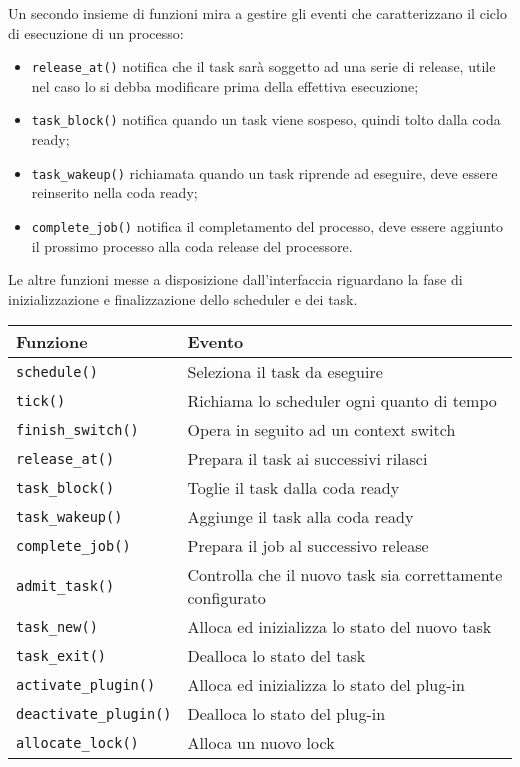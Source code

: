 \begin{appendices}
Un secondo insieme di funzioni mira a gestire gli eventi che caratterizzano il ciclo di esecuzione di un processo:\\

\begin{itemize}
	\item \texttt{release\_at()} notifica che il task sarà soggetto ad una serie di release, utile nel caso lo si debba modificare prima della effettiva esecuzione;
	\item \texttt{task\_block()} notifica quando un task viene sospeso, quindi tolto dalla coda ready;
	\item \texttt{task\_wakeup()} richiamata quando un task riprende ad eseguire, deve essere reinserito nella coda ready;
	\item \texttt{complete\_job()} notifica il completamento del processo, deve essere aggiunto il prossimo processo alla coda release del processore.\\
\end{itemize}

Le altre funzioni messe a disposizione dall'interfaccia riguardano la fase di inizializzazione e finalizzazione dello scheduler e dei task.\\

\begin{table}
  \centering
  \begin{tabular}{|ll|}
	\hline
	    Funzione & Evento \\ \hline \hline
	   
\texttt{schedule()} 			&	Seleziona il task da eseguire \\
\texttt{tick()} 				&	Richiama lo scheduler ogni quanto di tempo \\
\texttt{finish\_switch()}		&	Opera in seguito ad un context switch \\
\hline
\texttt{release\_at()}			&	Prepara il task ai successivi rilasci \\
\texttt{task\_block()}			&	Toglie il task dalla coda ready \\
\texttt{task\_wakeup()}			&	Aggiunge il task alla coda ready \\
\texttt{complete\_job()}		&	Prepara il job al successivo release \\
\hline
\texttt{admit\_task()}			&	Controlla che il nuovo task sia correttamente configurato \\
\texttt{task\_new()}			&	Alloca ed inizializza lo stato del nuovo task \\
\texttt{task\_exit()}			&	Dealloca lo stato del task \\
\hline
\texttt{activate\_plugin()}		&	Alloca ed inizializza lo stato del plug-in \\
\texttt{deactivate\_plugin()}	&	Dealloca lo stato del plug-in \\
\hline
\texttt{allocate\_lock()}		&	Alloca un nuovo lock \\
  	

\end{tabular}
\end{table}
\end{appendices}
